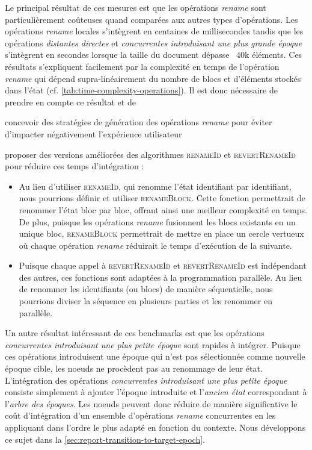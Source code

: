 \documentclass[12pt]{thesul}
\begin{document}
Le principal résultat de ces mesures est que les opérations \emph{rename} sont particulièrement coûteuses quand comparées aux autres types d'opérations.
Les opérations \emph{rename} locales s'intègrent en centaines de millisecondes tandis que les opérations \emph{distantes directes} et \emph{concurrentes introduisant une plus grande époque} s'intègrent en secondes lorsque la taille du document dépasse ~40k éléments.
Ces résultats s'expliquent facilement par la complexité en temps de l'opération \emph{rename} qui dépend supra-linéairement du nombre de blocs et d'éléments stockés dans l'état (cf. \autoref{tab:time-complexity-operations}).
Il est donc nécessaire de prendre en compte ce résultat et de
\begin{enumerate*}[label=(\roman*)]
  \item concevoir des stratégies de génération des opérations \emph{rename} pour éviter d'impacter négativement l'expérience utilisateur
  \item proposer des versions améliorées des algorithmes \textsc{renameId} et \textsc{revertRenameId} pour réduire ces temps d'intégration :
\end{enumerate*}

\begin{itemize}
  \item Au lieu d'utiliser \textsc{renameId}, qui renomme l'état identifiant par identifiant, nous pourrions définir et utiliser \textsc{renameBlock}.
    Cette fonction permettrait de renommer l'état bloc par bloc, offrant ainsi une meilleur complexité en temps.
    De plus, puisque les opérations \emph{rename} fusionnent les blocs existants en un unique bloc, \textsc{renameBlock} permettrait de mettre en place un cercle vertueux où chaque opération \emph{rename} réduirait le temps d'exécution de la suivante.
  \item Puisque chaque appel à \textsc{revertRenameId} et \textsc{revertRenameId} est indépendant des autres, ces fonctions sont adaptées à la programmation parallèle.
    Au lieu de renommer les identifiants (ou blocs) de manière séquentielle, nous pourrions diviser la séquence en plusieurs parties et les renommer en parallèle.
\end{itemize}

Un autre résultat intéressant de ces benchmarks est que les opérations \emph{concurrentes introduisant une plus petite époque} sont rapides à intégrer.
Puisque ces opérations introduisent une époque qui n'est pas sélectionnée comme nouvelle époque cible, les noeuds ne procèdent pas au renommage de leur état.
L'intégration des opérations \emph{concurrentes introduisant une plus petite époque} consiste simplement à ajouter l'époque introduite et l'\emph{ancien état} correspondant à l'\emph{arbre des époques}.
Les noeuds peuvent donc réduire de manière significative le coût d'intégration d'un ensemble d'opérations \emph{rename} concurrentes en les appliquant dans l'ordre le plus adapté en fonction du contexte.
Nous développons ce sujet dans la \autoref{sec:report-transition-to-target-epoch}.
\end{document}
